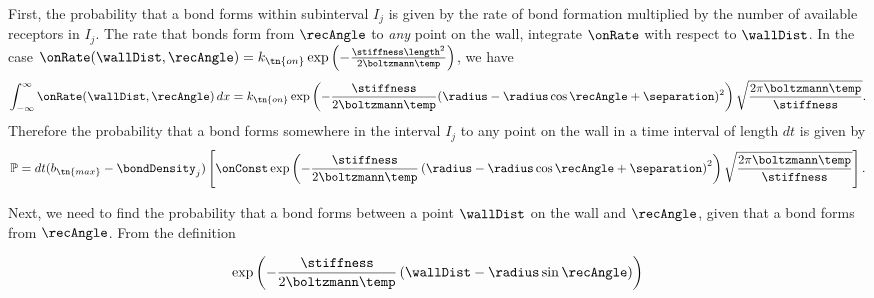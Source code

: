 

First, the probability that a bond forms within subinterval $I_j$ is
given by the rate of bond formation multiplied by the number of
available receptors in $I_j$. The rate that bonds form from $\recAngle$
to \emph{any} point on the wall, integrate $\onRate$ with respect to
$\wallDist$. In the case $\onRate(\wallDist, \recAngle) = k_\tn{on} \exp\left(-\frac{\stiffness
    \length^2}{2\boltzmann \temp}\right)$, we have
\begin{equation}
  \label{eq:total_fm_rate}
  \int_{-\infty}^{\infty} \onRate(\wallDist, \recAngle)\, dx = k_\tn{on} \exp
  \left( -\frac{\stiffness}{2\boltzmann \temp} (\radius - \radius \cos\recAngle + \separation)^2 \right)
  \sqrt{\frac{2 \pi \boltzmann \temp}{\stiffness}}.
\end{equation}
Therefore the probability that a bond forms somewhere in the interval
$I_j$ to any point on the wall in a time interval of length $dt$ is
given by 
\begin{equation}
  \label{eq:1}
  \mathbb{P} = dt (b_\tn{max} - \bondDensity_j) \left[ \onConst \exp \left( -
      \frac{\stiffness}{2 \boltzmann \temp} \left( \radius - \radius\cos\recAngle + \separation \right)^2 \right)
    \sqrt{\frac{2\pi \boltzmann \temp}{\stiffness}} \right].
\end{equation}

Next, we need to find the probability that a bond forms between a
point $\wallDist$ on the wall and $\recAngle$, given that a bond forms from
$\recAngle$. From the definition 

\begin{equation}
  \label{eq:2}
  \exp \left(-\frac{\stiffness}{2 \boltzmann \temp}
    \left(\wallDist - \radius \sin{\recAngle} \right) \right)
\end{equation}
